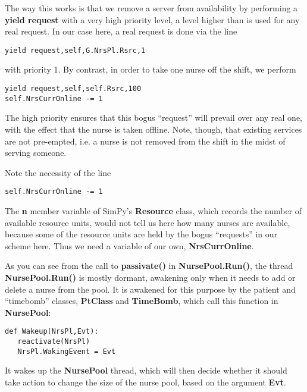 \documentclass[11pt]{article}
\begin{document}
The way this works is that we remove a server from availability by
performing a {\bf yield request} with a very high priority level, a
level higher than is used for any real request.  In our case here, a
real request is done via the line

\begin{Verbatim}[fontsize=\relsize{-2}]
yield request,self,G.NrsPl.Rsrc,1
\end{Verbatim}

with priority 1.  By contrast, in order to take one nurse off the shift,
we perform

\begin{Verbatim}[fontsize=\relsize{-2}]
yield request,self,self.Rsrc,100
self.NrsCurrOnline -= 1
\end{Verbatim}

The high priority ensures that this bogus ``request'' will prevail over
any real one, with the effect that the nurse is taken offline.  Note,
though, that existing services are not pre-empted, i.e. a nurse is not
removed from the shift in the midst of serving someone.

Note the necessity of the line

\begin{Verbatim}[fontsize=\relsize{-2}]
self.NrsCurrOnline -= 1
\end{Verbatim}

The {\bf n} member variable of SimPy's {\bf Resource} class, which
records the number of available resource units, would not tell us here
how many nurses are available, because some of the resource units are
held by the bogus ``requests'' in our scheme here.  Thus we need a
variable of our own, {\bf NrsCurrOnline}.

As you can see from the call to {\bf passivate()} in  {\bf
NursePool.Run()}, the thread {\bf NursePool.Run()} is mostly dormant,
awakening only when it needs to add or delete a nurse from the pool.  It
is awakened for this purpose by the patient and ``timebomb'' classes,
{\bf PtClass} and {\bf TimeBomb}, which call this function in {\bf
NursePool}:

\begin{Verbatim}[fontsize=\relsize{-2}]
def Wakeup(NrsPl,Evt):  
   reactivate(NrsPl)
   NrsPl.WakingEvent = Evt
\end{Verbatim}

It wakes up the {\bf NursePool} thread, which will then decide whether
it should take action to change the size of the nurse pool, based on the
argument {\bf Evt}.  
\end{document}
